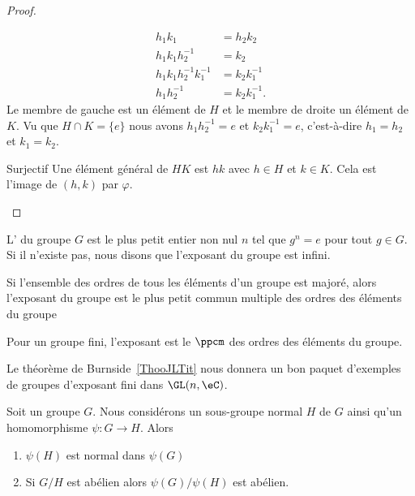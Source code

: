 \begin{proof}
\begin{subproof}
\begin{subproof}
            \begin{subequations}
                \begin{align}
                    h_1k_1&=h_2k_2\\
                    h_1 k_1 h_2^{-1}&=k_2\\
                    h_1k_1h_2^{-1}k_1^{-1}&=k_2k_1^{-1}\\
                    h_1h_2^{-1}&=k_2k_1^{-1}.
                \end{align}
            \end{subequations}
            Le membre de gauche est un élément de \( H\) et le membre de droite un élément de \( K\). Vu que \( H\cap K=\{ e \}\) nous avons \( h_1h_2^{-1}=e\) et \( k_2k_1^{-1}=e\), c'est-à-dire \( h_1=h_2\) et \( k_1=k_2\).
        \item[Surjectif]
            Une élément général de \( HK\) est \( hk\) avec \( h\in H\) et \( k\in K\). Cela est l'image de \( (h,k)\) par \( \varphi\).
        \end{subproof}
    \end{subproof}
\end{proof}

\begin{definition}  \label{DefvtSAyb}
    L' du groupe \( G\) est le plus petit entier non nul \( n\) tel que \( g^n=e\) pour tout \( g\in G\). Si il n'existe pas, nous disons que l'exposant du groupe est infini.
\end{definition}

\begin{proposition}\label{PROPooSWHHooOzqWkw}
    Si l'ensemble des ordres de tous les éléments d'un groupe est majoré, alors l'exposant du groupe est le plus petit commun multiple des ordres des éléments du groupe

    Pour un groupe fini, l'exposant est le $\ppcm$ des ordres des éléments du groupe.
\end{proposition}

Le théorème de Burnside~\ref{ThooJLTit} nous donnera un bon paquet d'exemples de groupes d'exposant fini dans \( \GL(n,\eC)\).

\begin{proposition} \label{PropSRMJooIDPBoW}
    Soit un groupe \( G\). Nous considérons un sous-groupe normal \( H\) de \( G\) ainsi qu'un homomorphisme \( \psi\colon G\to H\). Alors
    \begin{enumerate}
        \item
            \( \psi(H)\) est normal dans \( \psi(G)\)
        \item
            Si \( G/H\) est abélien alors \( \psi(G)/\psi(H)\) est abélien.
    \end{enumerate}
\end{proposition}

